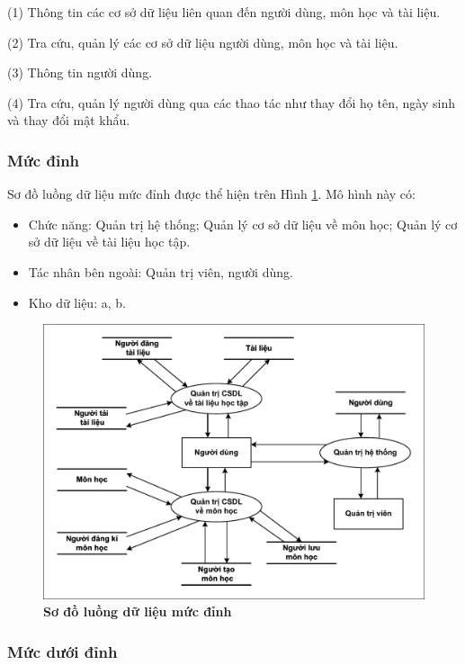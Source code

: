 \documentclass{article}
\begin{document}
	(1) Thông tin các cơ sở dữ liệu liên quan đến người dùng, môn học và tài liệu.

	(2) Tra cứu, quản lý các cơ sở dữ liệu người dùng, môn học và tài liệu.
	
	(3) Thông tin người dùng.
	
	(4) Tra cứu, quản lý người dùng qua các thao tác như thay đổi họ tên, ngày sinh và thay đổi mật khẩu.
	
	\subsubsection{Mức đỉnh}
	
	Sơ đồ luồng dữ liệu mức đỉnh được thể hiện trên Hình \ref{fig33}. Mô hình này có:
	
	\begin{itemize}
		\item Chức năng: Quản trị hệ thống; Quản lý cơ sở dữ liệu về môn học; Quản lý cơ sở dữ liệu về tài liệu học tập.
		\item Tác nhân bên ngoài: Quản trị viên, người dùng.
		\item Kho dữ liệu: a, b.
	\end{itemize}
	
	\begin{figure}[!ht]
		\centering
		\includegraphics[trim= 10pt 10pt 10pt 10pt, clip, width=15cm]{mucdinh_fig33.pdf}
		\caption [Sơ đồ luồng dữ liệu mức đỉnh]{\bfseries \fontsize{12pt}{0pt}\selectfont Sơ đồ luồng dữ liệu mức đỉnh}
		\label{fig33}
	\end{figure}
	
	\subsubsection{Mức dưới đỉnh}
\end{document}
